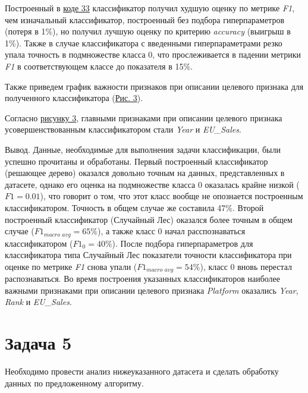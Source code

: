 Построенный в \hyperref[code:33]{коде 33} классификатор получил худшую оценку по метрике \textit{F1}, чем изначальный классификатор, построенный без подбора гиперпараметров (потеря в 1\%), но получил лучшую оценку по критерию \textit{accuracy} (выигрыш в 1\%). Также в случае классификатора с введенными гиперпараметрами резко упала точность в подмножестве класса 0, что прослеживается  в падении метрики \textit{F1} в соответствующем классе до показателя в 15\%.

Также приведем график важности признаков при описании целевого признака для полученного классификатора (\hyperref[image:3]{Рис. 3}).

\label{image:3}

Согласно \hyperref[image:3]{рисунку 3}, главными признаками при описании целевого признака усовершенствованным классификатором стали \textit{Year} и \textit{EU\_Sales}.

Вывод. Данные, необходимые для выполнения задачи классификации, были успешно прочитаны и обработаны. Первый построенный классификатор (решающее дерево) оказался довольно точным на данных, представленных в датасете, однако его оценка на подмножестве класса 0 оказалась крайне низкой ($\textit{F1} = 0.01$), что говорит о том, что этот класс вообще не опознается построенным классификатором. Точность в общем случае же составила 47\%. Второй построенный классификатор (Случайный Лес) оказался более точным в общем случае ($\textit{F1}_{\textit{macro avg}} = 65\%$), а также класс 0 начал расспознаваться классификатором ($\textit{F1}_{0} = 40\%$). После подбора гиперпараметров для классификатора типа Случайный Лес показатели точности классификатора при оценке по метрике \textit{F1} снова упали ($\textit{F1}_{\textit{macro avg}} = 54\%$), класс 0 вновь перестал распознаваться. Во время построения указанных классификаторов наиболее важными признаками при описании целевого признака \textit{Platform} оказались \textit{Year}, \textit{Rank} и \textit{EU\_Sales}.


\newpage
{}
\section{Задача 5}

Необходимо провести анализ нижеуказанного датасета и сделать обработку данных по предложенному алгоритму.


